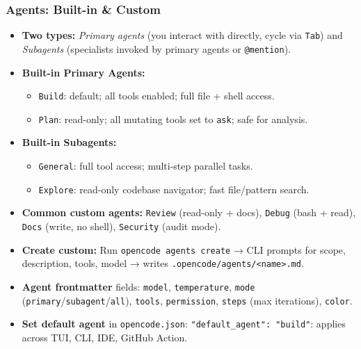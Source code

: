 \begin{frame}[fragile]\frametitle{Agents:  Built-in \& Custom}
  \begin{itemize}
    \item \textbf{Two types:} \textit{Primary agents} (you interact with directly, cycle via \texttt{Tab}) and \textit{Subagents} (specialists invoked by primary agents or \texttt{@mention}).
    \item \textbf{Built-in Primary Agents:}
      \begin{itemize}
        \item \texttt{Build}:  default; all tools enabled; full file + shell access.
        \item \texttt{Plan}:  read-only; all mutating tools set to \texttt{ask}; safe for analysis.
      \end{itemize}
    \item \textbf{Built-in Subagents:}
      \begin{itemize}
        \item \texttt{General}:  full tool access; multi-step parallel tasks.
        \item \texttt{Explore}:  read-only codebase navigator; fast file/pattern search.
      \end{itemize}
    \item \textbf{Common custom agents:} \texttt{Review} (read-only + docs), \texttt{Debug} (bash + read), \texttt{Docs} (write, no shell), \texttt{Security} (audit mode).
    \item \textbf{Create custom:} Run \texttt{opencode agents create} → CLI prompts for scope, description, tools, model → writes \texttt{.opencode/agents/<name>.md}.
    \item \textbf{Agent frontmatter} fields: \texttt{model}, \texttt{temperature}, \texttt{mode} (\texttt{primary}/\texttt{subagent}/\texttt{all}), \texttt{tools}, \texttt{permission}, \texttt{steps} (max iterations), \texttt{color}.
    \item \textbf{Set default agent} in \texttt{opencode.json}: \texttt{"default\_agent": "build"}:  applies across TUI, CLI, IDE, GitHub Action.
  \end{itemize}
\end{frame}

